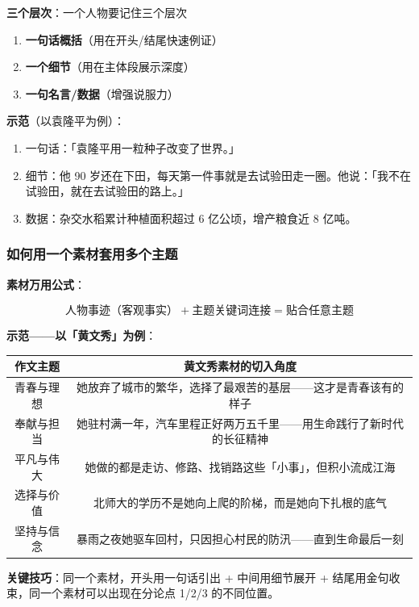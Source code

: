\textbf{三个层次}：一个人物要记住三个层次
\begin{enumerate}
  \item \textbf{一句话概括}（用在开头/结尾快速例证）
  \item \textbf{一个细节}（用在主体段展示深度）
  \item \textbf{一句名言/数据}（增强说服力）
\end{enumerate}

\textbf{示范}（以袁隆平为例）：
\begin{enumerate}
  \item 一句话：「袁隆平用一粒种子改变了世界。」
  \item 细节：他 90 岁还在下田，每天第一件事就是去试验田走一圈。他说：「我不在试验田，就在去试验田的路上。」
  \item 数据：杂交水稻累计种植面积超过 6 亿公顷，增产粮食近 8 亿吨。
\end{enumerate}

\subsubsection{如何用一个素材套用多个主题}

\textbf{素材万用公式}：

\[
\text{人物事迹（客观事实）} + \text{主题关键词连接} = \text{贴合任意主题}
\]

\textbf{示范——以「黄文秀」为例}：

\begin{center}
\begin{tabular}{c|c}
\textbf{作文主题} & \textbf{黄文秀素材的切入角度} \\ \hline
青春与理想 & 她放弃了城市的繁华，选择了最艰苦的基层——这才是青春该有的样子 \\
奉献与担当 & 她驻村满一年，汽车里程正好两万五千里——用生命践行了新时代的长征精神 \\
平凡与伟大 & 她做的都是走访、修路、找销路这些「小事」，但积小流成江海 \\
选择与价值 & 北师大的学历不是她向上爬的阶梯，而是她向下扎根的底气 \\
坚持与信念 & 暴雨之夜她驱车回村，只因担心村民的防汛——直到生命最后一刻 \\
\end{tabular}
\end{center}

\textbf{关键技巧}：同一个素材，开头用一句话引出 + 中间用细节展开 + 结尾用金句收束，同一个素材可以出现在分论点 1/2/3 的不同位置。

